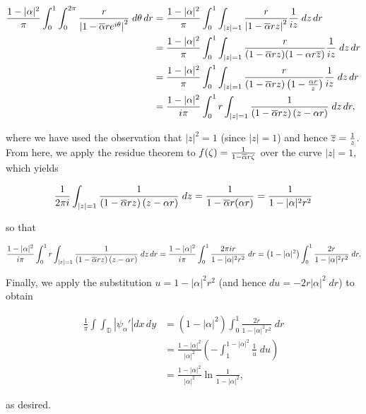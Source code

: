 \begin{solution}
  \begin{align*}
    \frac{1 - |\alpha|^2}{\pi} \int_0^1 \int_0^{2 \pi}  \frac{r}{\left|1 - \overline{\alpha}re^{i\theta}\right|^2} \; d\theta \, dr
      &= \frac{1 - |\alpha|^2}{\pi} \int_0^1 \int_{|z|=1} \frac{r}{\left|1 - \overline{\alpha}rz\right|^2} \frac{1}{iz} \; dz \, dr \\
      &= \frac{1 - |\alpha|^2}{\pi} \int_0^1 \int_{|z|=1} \frac{r}{(1 - \overline{\alpha} r z)(1 - \alpha r \overline{z})} \frac{1}{iz} \; dz \, dr \\
      &= \frac{1 - |\alpha|^2}{\pi} \int_0^1 \int_{|z|=1} \frac{r}{(1 - \overline{\alpha} r z)\left(1 - \frac{\alpha r}{z}\right)} \frac{1}{iz} \; dz \, dr \\
      &= \frac{1 - |\alpha|^2}{i \pi} \int_0^1 r \int_{|z|=1} \frac{1}{(1 - \overline{\alpha} r z)\left(z - \alpha r\right)} \; dz \, dr,
  \end{align*}

  where we have used the observation that $|z|^2 = 1$ (since $|z| = 1$) and hence $\overline{z} = \frac{1}{z}$. From here, 
  we apply the residue theorem to $f(\zeta) = \frac{1}{1 - \overline{\alpha} r \zeta}$ over the curve $|z| = 1$, which 
  yields

  $$
  \frac{1}{2 \pi i} \int_{|z|=1} \frac{1}{(1 - \overline{\alpha} r z)\left(z - \alpha r\right)} \; dz
    = \frac{1}{1 - \overline{\alpha} r (\alpha r)} 
    = \frac{1}{1 - |\alpha|^2 r^2}
  $$

  so that

  $$
    \frac{1 - |\alpha|^2}{i \pi} \int_0^1 r \int_{|z|=1} \frac{1}{(1 - \overline{\alpha} r z)\left(z - \alpha r\right)} \; dz \, dr
      = \frac{1 - |\alpha|^2}{i \pi} \int_0^1 \frac{2 \pi i r}{1 - |\alpha|^2 r^2} \; dr
      = \left(1 - |\alpha|^2 \right) \int_0^1 \frac{2 r}{1 - |\alpha|^2 r^2} \; dr.
  $$

  Finally, we apply the substitution $u = 1 - |\alpha|^2 r^2$ (and hence $du = -2 r |\alpha|^2 \; dr$) to obtain

  \begin{align*}
    \frac{1}{\pi} \int\int_{\mathbb{D}} \left| \psi_{\alpha}' \right| dx \, dy 
      &= \left(1 - |\alpha|^2 \right) \int_0^1 \frac{2 r}{1 - |\alpha|^2 r^2} \; dr \\
      &= \frac{1 - |\alpha|^2}{|\alpha|^2} \left(-\int_1^{1 - |\alpha|^2} \frac{1}{u} \; du\right) \\
      &= \frac{1 - |\alpha|^2}{|\alpha|^2} \ln{\frac{1}{1 - |\alpha|^2}},
  \end{align*}

  as desired.
  \ \\
\end{solution}
